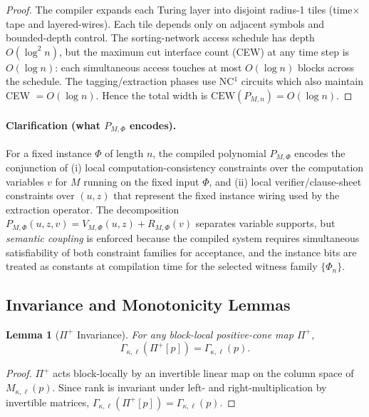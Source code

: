 \documentclass[12pt]{article}
\newtheorem{lemma}[theorem]{Lemma}
\theoremstyle{definition}
\theoremstyle{definition}
\theoremstyle{remark}
\theoremstyle{remark}
\begin{document}
\begin{proof}
The compiler expands each Turing layer into disjoint radius-1 tiles
(time$\times$tape and layered-wires).
Each tile depends only on adjacent symbols and bounded-depth control.
The sorting-network access schedule has depth $O(\log^2 n)$,
but the maximum cut interface count (CEW) at any time step is $O(\log n)$:
each simultaneous access touches at most $O(\log n)$ blocks across the schedule.
The tagging/extraction phases use NC$^1$ circuits which also maintain CEW $= O(\log n)$.
Hence the total width is $\mathrm{CEW}(P_{M,n}) = O(\log n)$.
\end{proof}

\paragraph{Clarification (what $P_{M,\Phi}$ encodes).}
For a fixed instance $\Phi$ of length $n$, the compiled polynomial $P_{M,\Phi}$
encodes the conjunction of (i) local computation-consistency constraints over the
computation variables $v$ for $M$ running on the fixed input $\Phi$, and (ii) local
verifier/clause-sheet constraints over $(u,z)$ that represent the fixed instance wiring
used by the extraction operator. The decomposition
$P_{M,\Phi}(u,z,v)=V_{M,\Phi}(u,z)+R_{M,\Phi}(v)$
separates variable supports, but \emph{semantic coupling} is enforced because the compiled
system requires simultaneous satisfiability of both constraint families for acceptance,
and the instance bits are treated as constants at compilation time for the selected witness
family $\{\Phi_n\}$.

\subsection{Invariance and Monotonicity Lemmas}

\begin{lemma}[$\Pi^+$ Invariance]\label{lem:pi-plus-formal}
For any block-local positive-cone map $\Pi^+$,
\[
\Gamma_{\kappa,\ell}(\Pi^+[p]) = \Gamma_{\kappa,\ell}(p).
\]
\end{lemma}

\begin{proof}
$\Pi^+$ acts block-locally by an invertible linear map on the column space of $M_{\kappa,\ell}(p)$.
Since rank is invariant under left- and right-multiplication by invertible matrices,
$\Gamma_{\kappa,\ell}(\Pi^+[p]) = \Gamma_{\kappa,\ell}(p)$.
\end{proof}
\end{document}
